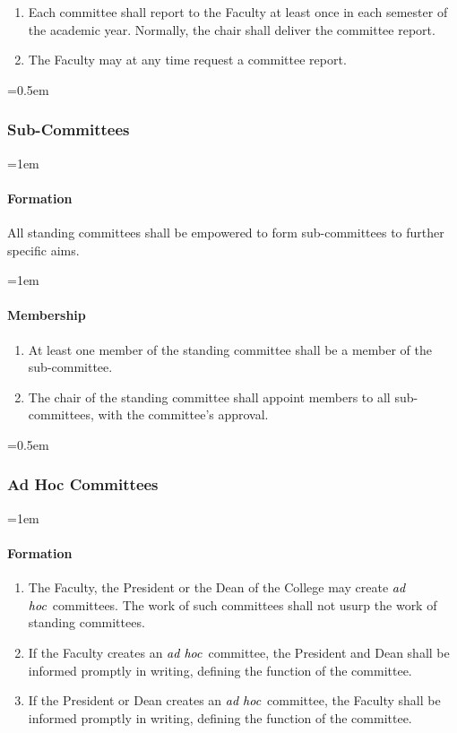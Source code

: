\documentclass{manual}
\newcommand{\keyword}[1]{\textcolor{black}{#1}}
\newcommand{\adho}{\keyword{\textit{ad hoc}}~}
\let\oldsubsubsection\subsubsection
\renewcommand\subsubsection{\leftskip=0.5em\oldsubsubsection}
\let\oldparagraph\paragraph
\renewcommand\paragraph{\leftskip=1em\oldparagraph}
\newcommand{\itemLevelA}{\alph*.}
\newcommand{\itemRefA}{\alph*}
\begin{document}
				\begin{enumerate}[label=\itemLevelA,ref=\itemRefA]
				\item Each committee shall report to the Faculty at least once in each semester of the academic year. Normally, the chair shall deliver the committee report.
				\item The Faculty may at any time request a committee report. 
				\end{enumerate}

		\subsubsection{Sub-Committees}

			\paragraph{Formation}
			All standing committees shall be empowered to form sub-committees to further specific aims. 

			\paragraph{Membership}

				\begin{enumerate}[label=\itemLevelA,ref=\itemRefA]
				\item At least one member of the standing committee shall be a member of the sub-committee.
				\item The chair of the standing committee shall appoint members to all sub-committees, with the committee's approval.
				\end{enumerate}

		\subsubsection{Ad Hoc Committees}

			\paragraph{Formation}

				\begin{enumerate}[label=\itemLevelA,ref=\itemRefA]
				\item The Faculty, the President or the Dean of the College may create \adho committees. The work of such committees shall not usurp the work of standing committees.
				\item If the Faculty creates an \adho committee, the President and Dean shall be informed promptly in writing, defining the function of the committee.
				\item If the President or Dean creates an \adho committee, the Faculty shall be informed promptly in writing, defining the function of the committee.
				\end{enumerate}
\end{document}
